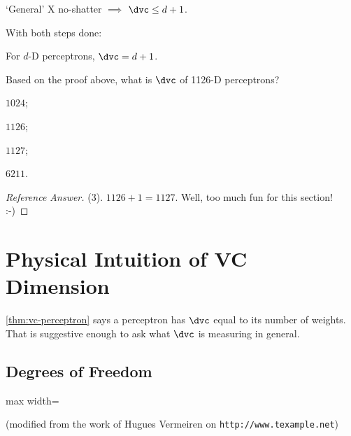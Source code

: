 \begin{moral}
    `General' \(\mathrm{X}\) no-shatter \(\implies\) \(\dvc \le d + 1\).
\end{moral}

With both steps done:

\begin{theorem}\label{thm:vc-perceptron}
    For \(d\)-D perceptrons, \(\dvc = d + 1\).
\end{theorem}

\begin{exercise}
    Based on the proof above, what is \(\dvc\) of 1126-D perceptrons?
    \begin{enumerate*}[(1)]
        \item \(1024\); \item \(1126\); \item \(1127\); \item \(6211\).
    \end{enumerate*}
\end{exercise}

\begin{proof}[Reference Answer]
    (3). \(1126 + 1 = 1127\). Well, too much fun for this section! :-)
\end{proof}

\section{Physical Intuition of VC Dimension}\label{sec:vc-intuition}


\autoref{thm:vc-perceptron} says a perceptron has \(\dvc\) equal to its number of
weights. That is suggestive enough to ask what \(\dvc\) is measuring in general.

\subsection{Degrees of Freedom}

\begin{center}
    \begin{adjustbox}{max width=\textwidth}
    \end{adjustbox}

    {\footnotesize (modified from the work of Hugues Vermeiren on
    \nolinkurl{http://www.texample.net})}
\end{center}

